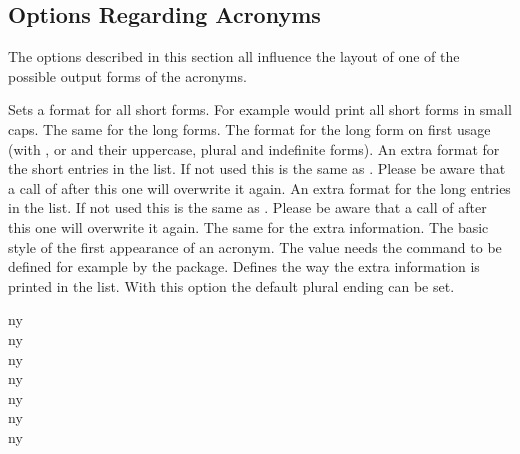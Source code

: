\documentclass[DIV10,toc=index,toc=bib,hyperfootnotes=false]{cnpkgdoc}
\makeatletter
\providecommand*\sinceversion[1]{%
  \@bsphack
  \marginnote{%
    \footnotesize\sffamily\RaggedRight
    \textcolor{black!75}{Introduced in version~#1}}%
  \@esphack}
\providecommand*\changedversion[1]{%
  \@bsphack
  \marginnote{%
    \footnotesize\sffamily\RaggedRight
    \textcolor{black!75}{Changed in version~#1}}%
  \@esphack}
\makeatother
\begin{document}
\subsection{Options Regarding Acronyms}
The options described in this section all influence the layout of one of the
possible output forms of the acronyms.
\begin{beschreibung}
 \Default
   Sets a format for all short forms. For example 
   would print all short forms in small caps.
 \Default
   The same for the long forms.
 \Default
   \sinceversion{1.2}%
   The format for the long form on first usage (with ,  or
    and their uppercase, plural and indefinite forms).
 \Default
   \sinceversion{1.1}An extra format for the short entries in the list. If not
   used this is the same as . Please be aware that a call of
    after this one will overwrite it again.
 \Default
   An extra format for the long entries in the list. If not used this is the same
   as . Please be aware that a call of  after
   this one will overwrite it again.
 \Default
   The same for the extra information.
   \changedversion{1.1}The basic style of the first appearance of an acronym.
   The value  needs the command  to be defined for
   example by the  package.
   Defines the way the extra information is printed in the list.
   With this option the default plural ending can be set.
\end{beschreibung}

\begin{beispiel}
 \acf{ny} \\
 \acf{ny} \\
 \acf{ny} \\
 \acf{ny} \\
 \acf{ny} \\
 \acf{ny} \\
 \acf{ny}
\end{beispiel}
\end{document}
